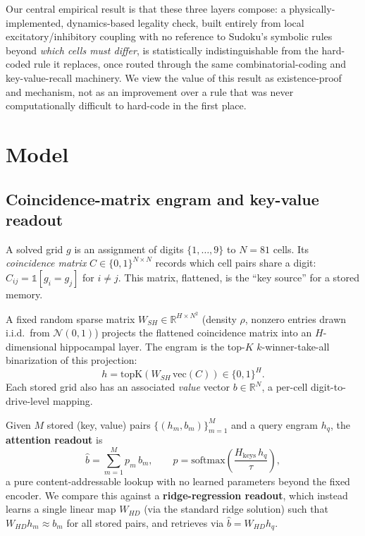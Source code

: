 \documentclass[11pt]{article}
\begin{document}
Our central empirical result is that these three layers compose: a physically-implemented,
dynamics-based legality check, built entirely from local excitatory/inhibitory coupling with
no reference to Sudoku's symbolic rules beyond \emph{which cells must differ}, is
statistically indistinguishable from the hard-coded rule it replaces, once routed through the
same combinatorial-coding and key-value-recall machinery. We view the value of this result as
existence-proof and mechanism, not as an improvement over a rule that was never
computationally difficult to hard-code in the first place.

\section{Model}

\subsection{Coincidence-matrix engram and key-value readout}

A solved grid $g$ is an assignment of digits $\{1,\dots,9\}$ to $N=81$ cells. Its
\emph{coincidence matrix} $C\in\{0,1\}^{N\times N}$ records which cell pairs share a digit:
$C_{ij} = \mathbb{1}[g_i = g_j]$ for $i\neq j$. This matrix, flattened, is the ``key source''
for a stored memory.

A fixed random sparse matrix $W_{SH}\in\mathbb{R}^{H\times N^2}$ (density $\rho$, nonzero
entries drawn i.i.d.\ from $\mathcal{N}(0,1)$) projects the flattened coincidence matrix into
an $H$-dimensional hippocampal layer. The engram is the top-$K$ $k$-winner-take-all
binarization of this projection:
\begin{equation}
h = \mathrm{topK}\!\left(W_{SH}\,\mathrm{vec}(C)\right) \in \{0,1\}^H .
\end{equation}
Each stored grid also has an associated \emph{value} vector $b\in\mathbb{R}^N$, a per-cell
digit-to-drive-level mapping.

Given $M$ stored (key, value) pairs $\{(h_m, b_m)\}_{m=1}^M$ and a query engram $h_q$, the
\textbf{attention readout} is
\begin{equation}
\hat b = \sum_{m=1}^{M} p_m\, b_m, \qquad
p = \mathrm{softmax}\!\left(\frac{H_{\mathrm{keys}}\, h_q}{\tau}\right),
\end{equation}
a pure content-addressable lookup with no learned parameters beyond the fixed encoder. We
compare this against a \textbf{ridge-regression readout}, which instead learns a single
linear map $W_{HD}$ (via the standard ridge solution) such that $W_{HD} h_m \approx b_m$ for
all stored pairs, and retrieves via $\hat b = W_{HD} h_q$.
\end{document}
